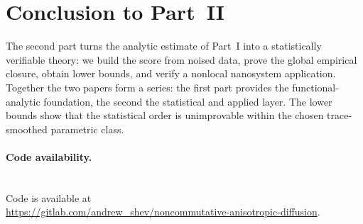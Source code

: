 \documentclass{article}
\begin{document}
\section{Conclusion to Part~II}

The second part turns the analytic estimate of Part~I into a statistically
verifiable theory: we build the score from noised data, prove the global empirical
closure, obtain lower bounds, and verify a nonlocal nanosystem application.
Together the two papers form a series: the first part provides the
functional-analytic foundation, the second the statistical and applied layer. The
lower bounds show that the statistical order is unimprovable within the chosen
trace-smoothed parametric class.

\paragraph{Code availability.}\mbox{}\\
Code is available at\\
\url{https://gitlab.com/andrew_shev/noncommutative-anisotropic-diffusion}.




\end{document}
